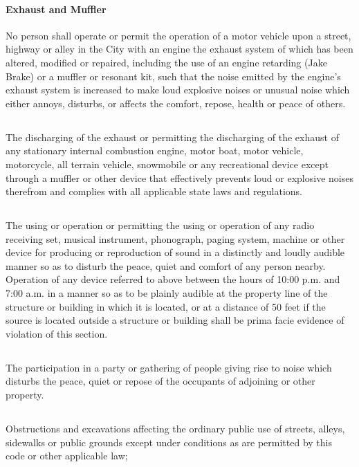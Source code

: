 \paragraph{Exhaust and Muffler}
No person shall operate or permit the operation of a motor vehicle upon a street, highway or alley in the City with an engine the exhaust system of which has been altered, modified or repaired, including the use of an engine retarding (Jake Brake) or a muffler or resonant kit, such that the noise emitted by the engine’s exhaust system is increased to make loud explosive noises or unusual noise which either annoys, disturbs, or affects the comfort, repose, health or peace of others.
\subsection{}
The discharging of the exhaust or permitting the discharging of the exhaust of any stationary internal combustion engine, motor boat, motor vehicle, motorcycle, all terrain vehicle, snowmobile or any recreational device except through a muffler or other device that effectively prevents loud or explosive noises therefrom and complies with all applicable state laws and regulations.
\subsection{}
The using or operation or permitting the using or operation of any radio receiving set, musical instrument, phonograph, paging system, machine or other device for producing or reproduction of sound in a distinctly and loudly audible manner so as to disturb the peace, quiet and comfort of any person nearby. Operation of any device referred to above between the hours of 10:00 p.m. and 7:00 a.m. in a manner so as to be plainly audible at the property line of the structure or building in which it is located, or at a distance of 50 feet if the source is located outside a structure or building shall be prima facie evidence of violation of this section.
\subsection{}
The participation in a party or gathering of people giving rise to noise which disturbs the peace, quiet or repose of the occupants of adjoining or other property.
\subsection{}
Obstructions and excavations affecting the ordinary public use of streets, alleys, sidewalks or public grounds except under conditions as are permitted by this code or other applicable law;
